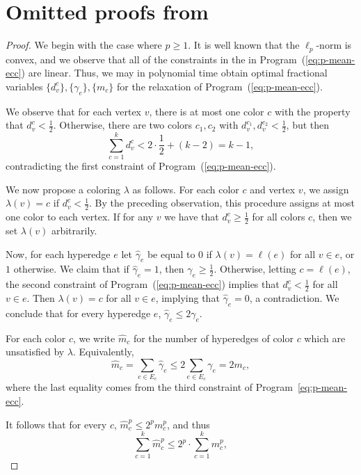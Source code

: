 \section{Omitted proofs from~\texorpdfstring{}{}}
\label{app:gm}

\pmeanapproximation*
\begin{proof}

    We begin with the case where $p \geq 1$.
    It is well known that the $\ell_p$-norm is convex, and we observe that all of the constraints in the
    in Program~(\ref{eq:p-mean-ecc}) are linear. Thus, we may in polynomial time obtain optimal fractional variables $\{d_v^c\}, \{\gamma_e\}, \{m_c\}$
    for the relaxation of Program~(\ref{eq:p-mean-ecc}).

    We observe that for each vertex $v$, there is at most one color $c$ with the property that $d_v^c < \frac{1}{2}$.
    Otherwise, there are two colors $c_1, c_2$ with $d_v^{c_1}, d_v^{c_2} < \frac{1}{2}$, but then
    \[
        \sum_{c=1}^k d_v^c < 2\cdot\frac{1}{2} + (k - 2) = k - 1,
    \]
    contradicting the first constraint of Program~(\ref{eq:p-mean-ecc}).

    We now propose a coloring $\lambda$ as follows. For each color $c$ and vertex $v$, we assign $\lambda(v) = c$ if $d_v^c < \frac{1}{2}$.
    By the preceding observation, this procedure assigns at most one color to each vertex.
    If for any $v$ we have that $d_v^c \geq \frac{1}{2}$ for all colors $c$, then we set $\lambda(v)$ arbitrarily.

    Now, for each hyperedge $e$ let $\hat{\gamma}_e$ be equal to $0$ if $\lambda(v) = \ell(e)$ for all $v \in e$, or $1$ otherwise.
    We claim that if $\hat{\gamma}_e = 1$, then $\gamma_e \geq \frac{1}{2}$.
    Otherwise, letting $c = \ell(e)$, the second constraint of Program~(\ref{eq:p-mean-ecc}) implies that $d_v^c < \frac{1}{2}$ for all $v \in e$.
    Then $\lambda(v) = c$ for all $v \in e$, implying that $\hat{\gamma}_e = 0$, a contradiction.
    We conclude that for every hyperedge $e$, $\hat{\gamma}_e \leq 2\gamma_e$.

    For each color $c$, we write $\hat{m}_c$ for the number of hyperedges of color $c$ which are unsatisfied by $\lambda$.
    Equivalently,
    \[
        \hat{m}_c = \sum_{e \in E_c} \hat{\gamma}_e \leq 2\sum_{e \in E_c} \gamma_e = 2m_c,
    \]
    where the last equality comes from the third constraint of Program~\ref{eq:p-mean-ecc}.

    It follows that for every $c$, $\hat{m}_c^p \leq 2^pm_c^p$, and thus
    \[
        \sum_{c=1}^k \hat{m}_c^p \leq 2^p \cdot \sum_{c=1}^k m_c^p,
    \]


\end{proof}
